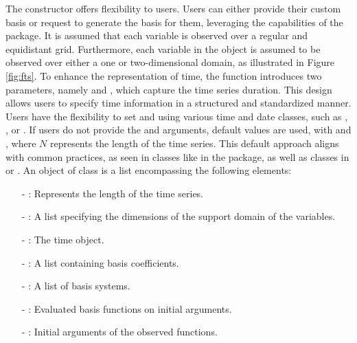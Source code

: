The  constructor offers flexibility to users. Users can either provide 
their custom basis or request  to generate the basis for them, leveraging 
the capabilities of the  package. It is assumed that each variable is 
observed over a regular and equidistant grid. Furthermore, each variable in the 
 object is assumed to be observed over either a one or two-dimensional 
domain, as illustrated in Figure \ref{fig:fts}. 
To enhance the representation of 
time, the  function introduces	two parameters, namely  
and , which capture the time 	series duration. This design allows users to 
specify time information in a	structured and standardized manner. Users have the 
flexibility to set 	 and  using various time and date 
classes, such as 	, , or . If users do not 
provide the  and  arguments, default values are used, with 
 and , where $N$ represents the length of the time 
series. This default approach aligns with common practices, as seen in classes 
like  in the  package, as well as  classes in 
 or .
An object of class  is a list encompassing the following elements:
	\begin{enumerate}
		\item[-] : Represents the length of the time series.
		\item[-] : A list specifying the dimensions of the support 
		domain of 
		the variables.
		\item[-] :  The time object.
		\item[-] :  A list containing basis coefficients.
		\item[-] :  A list of basis systems.
		\item[-] :  Evaluated basis functions on initial arguments.
		\item[-] :  Initial arguments of the observed functions.
	\end{enumerate}

